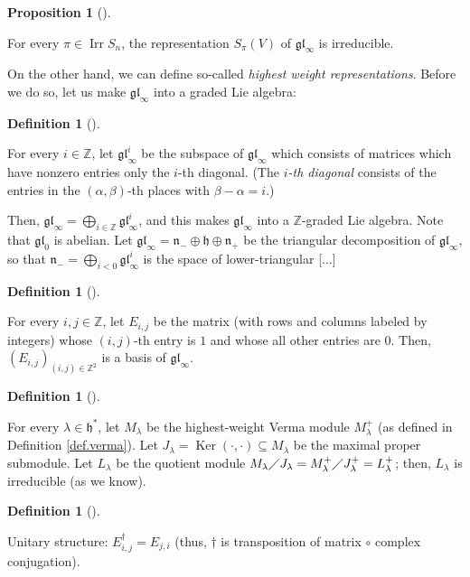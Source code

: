 \documentclass
[numbers=enddot,12pt,final,onecolumn,german,notitlepage]{scrartcl}%
\theoremstyle{definition}
\newtheorem{prop}[theo]{Proposition}
\newenvironment{proposition}[1][]
{\begin{prop}[#1]\begin{leftbar}}
{\end{leftbar}\end{prop}}
\newtheorem{defi}[theo]{Definition}
\newenvironment{definition}[1][]
{\begin{defi}[#1]\begin{leftbar}}
{\end{leftbar}\end{defi}}
\begin{document}
\begin{proposition}
For every $\pi\in\operatorname*{Irr}S_{n}$, the representation $S_{\pi}\left(
V\right)  $ of $\mathfrak{gl}_{\infty}$ is irreducible.
\end{proposition}

On the other hand, we can define so-called \textit{highest weight
representations}. Before we do so, let us make $\mathfrak{gl}_{\infty}$ into a
graded Lie algebra:

\begin{definition}
For every $i\in\mathbb{Z}$, let $\mathfrak{gl}_{\infty}^{i}$ be the subspace
of $\mathfrak{gl}_{\infty}$ which consists of matrices which have nonzero
entries only the $i$-th diagonal. (The $i$\textit{-th diagonal} consists of
the entries in the $\left(  \alpha,\beta\right)  $-th places with
$\beta-\alpha=i$.)

Then, $\mathfrak{gl}_{\infty}=\bigoplus\limits_{i\in\mathbb{Z}}\mathfrak{gl}%
_{\infty}^{i}$, and this makes $\mathfrak{gl}_{\infty}$ into a $\mathbb{Z}%
$-graded Lie algebra. Note that $\mathfrak{gl}_{0}$ is abelian. Let
$\mathfrak{gl}_{\infty}=\mathfrak{n}_{-}\oplus\mathfrak{h}\oplus
\mathfrak{n}_{+}$ be the triangular decomposition of $\mathfrak{gl}_{\infty}$,
so that $\mathfrak{n}_{-}=\bigoplus\limits_{i<0}\mathfrak{gl}_{\infty}^{i}$ is
the space of lower-triangular [...]
\end{definition}

\begin{definition}
For every $i,j\in\mathbb{Z}$, let $E_{i,j}$ be the matrix (with rows and
columns labeled by integers) whose $\left(  i,j\right)  $-th entry is $1$ and
whose all other entries are $0$. Then, $\left(  E_{i,j}\right)  _{\left(
i,j\right)  \in\mathbb{Z}^{2}}$ is a basis of $\mathfrak{gl}_{\infty}$.
\end{definition}

\begin{definition}
For every $\lambda\in\mathfrak{h}^{\ast}$, let $M_{\lambda}$ be the
highest-weight Verma module $M_{\lambda}^{+}$ (as defined in Definition
\ref{def.verma}). Let $J_{\lambda}=\operatorname*{Ker}\left(  \cdot
,\cdot\right)  \subseteq M_{\lambda}$ be the maximal proper submodule. Let
$L_{\lambda}$ be the quotient module $M_{\lambda}\diagup J_{\lambda
}=M_{\lambda}^{+}\diagup J_{\lambda}^{+}=L_{\lambda}^{+}$; then, $L_{\lambda}$
is irreducible (as we know).
\end{definition}

\begin{definition}
Unitary structure: $E_{i,j}^{\dag}=E_{j,i}$ (thus, $\dag$ is transposition of
matrix $\circ$ complex conjugation).
\end{definition}
\end{document}
